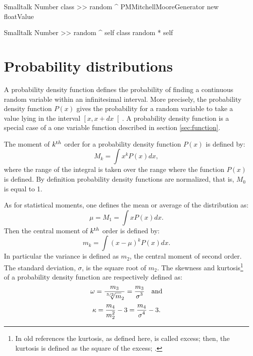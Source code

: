 \begin{displaycode}{Smalltalk}
Number class >> random
    ^ PMMitchellMooreGenerator new floatValue
\end{displaycode}

\begin{displaycode}{Smalltalk}
Number >> random
    ^ self class random * self
\end{displaycode}

\section{Probability distributions}
\label{sec:probdistr}A probability density function defines the probability of finding a continuous random variable within an infinitesimal interval.
More precisely, the probability density function $P\left(x\right)$ gives the probability for a random variable to take a value lying in the interval $\left[x,x+dx\right[$.
A probability density function is a special case of a one variable function described in section
\ref{sec:function}.

The moment of $k^{\mathop{\textrm th}}$ order for a probability
density function $P\left(x\right)$ is defined by:
\begin{equation}
\label{eq:probdensity}
  M_k=\int x^k P\left(x\right) dx,
\end{equation}
where the range of the integral is taken over the range where the
function $P\left(x\right)$ is defined. By definition probability
density functions are normalized, that is, $M_0$ is equal to 1.

As for statistical moments, one defines the mean or average of the
distribution as:
\begin{equation}
  \mu=M_1=\int x P\left(x\right) dx.
\end{equation}
Then the central moment of $k^{\mathop{\textrm th}}$ order is defined
by:
\begin{equation}
  m_k=\int \left(x-\mu\right)^k P\left(x\right) dx.
\end{equation}
In particular the variance is defined as $m_2$, the central moment
of second order. The standard deviation, $\sigma$, is the square
root of $m_2$. The skewness and kurtosis\footnote{In old
references the kurtosis, as defined here, is called excess; then,
the kurtosis is defined as the square of the excess;
\cite{AbrSteg} \eg.} of a probability density function are
respectively defined as:
\begin{equation}
  \omega={\displaystyle m_3 \over\displaystyle {\root 3/2 \of m_2}}
  ={\displaystyle m_3 \over\displaystyle \sigma^3}\mbox{\quad and}
\end{equation}
\begin{equation}
  \kappa={\displaystyle m_4 \over\displaystyle m_2^2}-3
  ={\displaystyle m_4 \over\displaystyle \sigma^4}-3.
\end{equation}

